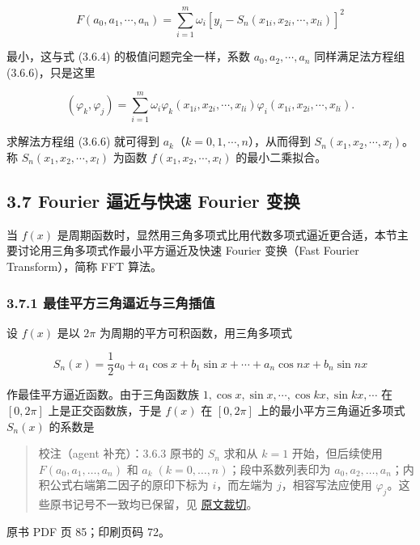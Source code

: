 \[
F(a_0,a_1,\cdots,a_n)=\sum_{i=1}^m\omega_i[y_i-S_n(x_{1i},x_{2i},\cdots,x_{li})]^2
\]

最小，这与式 (3.6.4) 的极值问题完全一样，系数 \(a_0,a_2,\cdots,a_n\) 同样满足法方程组 (3.6.6)，只是这里

\[
(\varphi_k,\varphi_j)=\sum_{i=1}^m\omega_i\varphi_k(x_{1i},x_{2i},\cdots,x_{li})\varphi_i(x_{1i},x_{2i},\cdots,x_{li}).
\]

求解法方程组 (3.6.6) 就可得到 \(a_k\)（\(k=0,1,\cdots,n\)），从而得到 \(S_n(x_1,x_2,\cdots,x_l)\)。称 \(S_n(x_1,x_2,\cdots,x_l)\) 为函数 \(f(x_1,x_2,\cdots,x_l)\) 的最小二乘拟合。

\subsection{3.7 Fourier 逼近与快速 Fourier 变换}\label{ch03b-fourier-ux903cux8fd1ux4e0eux5febux901f-fourier-ux53d8ux6362}

当 \(f(x)\) 是周期函数时，显然用三角多项式比用代数多项式逼近更合适，本节主要讨论用三角多项式作最小平方逼近及快速 Fourier 变换（Fast Fourier Transform），简称 FFT 算法。

\subsubsection{3.7.1 最佳平方三角逼近与三角插值}\label{ch03b-ux6700ux4f73ux5e73ux65b9ux4e09ux89d2ux903cux8fd1ux4e0eux4e09ux89d2ux63d2ux503c}

设 \(f(x)\) 是以 \(2\pi\) 为周期的平方可积函数，用三角多项式

\[
S_n(x)=\frac12a_0+a_1\cos x+b_1\sin x+\cdots+a_n\cos nx+b_n\sin nx\tag{3.7.1}
\]

作最佳平方逼近函数。由于三角函数族 \(1,\cos x,\sin x,\cdots,\cos kx,\sin kx,\cdots\) 在 \([0,2\pi]\) 上是正交函数族，于是 \(f(x)\) 在 \([0,2\pi]\) 上的最小平方三角逼近多项式 \(S_n(x)\) 的系数是

\begin{quote}
校注（agent 补充）：3.6.3 原书的 \(S_n\) 求和从 \(k=1\) 开始，但后续使用 \(F(a_0,a_1,\ldots,a_n)\) 和 \(a_k\;(k=0,\ldots,n)\)；段中系数列表印为 \(a_0,a_2,\ldots,a_n\)；内积公式右端第二因子的原印下标为 \(i\)，而左端为 \(j\)，相容写法应使用 \(\varphi_j\)。这些原书记号不一致均已保留，见 \href{verified/assets/ch03b/p084-multivariate-formulas.png}{原文裁切}。
\end{quote}

\clearpage

原书 PDF 页 85；印刷页码 72。

